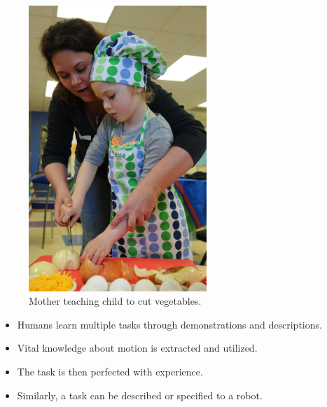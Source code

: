 \documentclass[aspectratio=169]{beamer}
\begin{document}
\begin{frame}
	\begin{minipage}[t]{0.49\textwidth}
	\begin{figure}
		\includegraphics[width=0.6\textwidth]{images/mother_child}
		\caption{Mother teaching child to cut vegetables.}
	\end{figure}
		\end{minipage}
		\hfil
	\begin{minipage}[t]{0.49\textwidth}
			\begin{itemize}
				\item Humans learn multiple tasks through demonstrations and descriptions.
				\item Vital knowledge about motion is extracted and utilized.
				\item The task is then perfected with experience.
				\item Similarly, a task can be described or specified to a robot. 
			\end{itemize}
		\end{minipage}
		
\end{frame}
\end{document}
